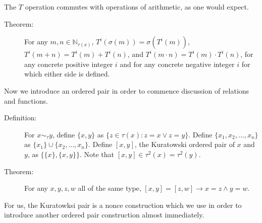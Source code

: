 \documentclass[12pt]{article}
\begin{document}
The $T$ operation commutes with operations of arithmetic, as one would expect.

\begin{description}

\item[Theorem:]  For any $m,n \in \mathbb N_{\tau(x)}$, $T^i(\sigma(m)) = \sigma(T^i(m))$, $T^i(m+n) = T^i(m)+T^i(n)$, and $T^i(m\cdot n) = T^i(m) \cdot T^i(n)$, for any concrete positive integer $i$ and for any concrete negative integer $i$ for which either side is defined.

\end{description}

Now we introduce an ordered pair in order to commence discussion of relations and functions.

\begin{description}

\item[Definition:]  For $x \sim_\tau y$, define $\{x,y\}$ as $\{z \in \tau(x):z = x \vee z = y\}$.  Define $\{x_1,x_2,\ldots,x_n\}$ as $\{x_1\} \cup \{x_2,\ldots,x_n\}$.
Define $[x,y]$, the Kuratowski ordered pair of $x$ and $y$, as $\{\{x\},\{x,y\}\}$.  Note that $[x,y] \in \tau^2(x) = \tau^2(y)$.

\item[Theorem:]  For any $x,y,z,w$ all of the same type, $[x,y] = [z,w] \rightarrow x=z \wedge y=w$.

\end{description}

For us, the Kuratowksi pair is a nonce construction which we use in order to introduce another ordered pair construction almost immediately.
\end{document}
